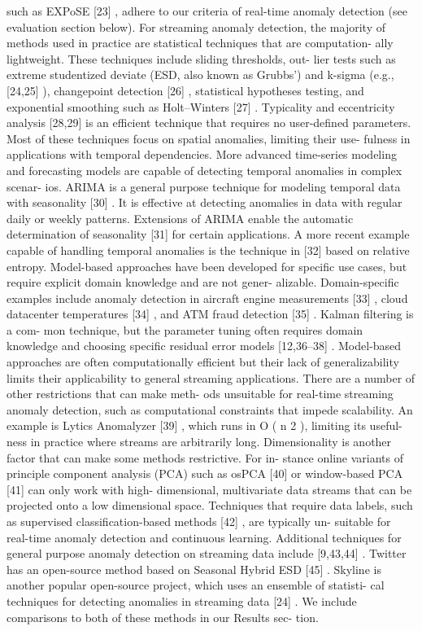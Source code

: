 \documentclass[12pt]{article}
\begin{document}
such as EXPoSE [23] , adhere to our criteria of real-time anomaly
detection (see evaluation section below).
For streaming anomaly detection, the majority of methods
used in practice are statistical techniques that are computation-
ally lightweight. These techniques include sliding thresholds, out-
lier tests such as extreme studentized deviate (ESD, also known
as Grubbs’) and k-sigma (e.g., [24,25] ), changepoint detection [26] ,
statistical hypotheses testing, and exponential smoothing such as
Holt–Winters [27] . Typicality and eccentricity analysis [28,29] is an
efficient technique that requires no user-defined parameters. Most
of these techniques focus on spatial anomalies, limiting their use-
fulness in applications with temporal dependencies.
More advanced time-series modeling and forecasting models
are capable of detecting temporal anomalies in complex scenar-
ios. ARIMA is a general purpose technique for modeling temporal
data with seasonality [30] . It is effective at detecting anomalies in
data with regular daily or weekly patterns. Extensions of ARIMA
enable the automatic determination of seasonality [31] for certain
applications. A more recent example capable of handling temporal
anomalies is the technique in [32] based on relative entropy.
Model-based approaches have been developed for specific use
cases, but require explicit domain knowledge and are not gener-
alizable. Domain-specific examples include anomaly detection in
aircraft engine measurements [33] , cloud datacenter temperatures
[34] , and ATM fraud detection [35] . Kalman filtering is a com-
mon technique, but the parameter tuning often requires domain
knowledge and choosing specific residual error models [12,36–38] .
Model-based approaches are often computationally efficient but
their lack of generalizability limits their applicability to general
streaming applications. There are a number of other restrictions that can make meth-
ods unsuitable for real-time streaming anomaly detection, such as
computational constraints that impede scalability. An example is
Lytics Anomalyzer [39] , which runs in O ( n 2 ), limiting its useful-
ness in practice where streams are arbitrarily long. Dimensionality
is another factor that can make some methods restrictive. For in-
stance online variants of principle component analysis (PCA) such
as osPCA [40] or window-based PCA [41] can only work with high-
dimensional, multivariate data streams that can be projected onto
a low dimensional space. Techniques that require data labels, such
as supervised classification-based methods [42] , are typically un-
suitable for real-time anomaly detection and continuous learning.
Additional techniques for general purpose anomaly detection
on streaming data include [9,43,44] . Twitter has an open-source
method based on Seasonal Hybrid ESD [45] . Skyline is another
popular open-source project, which uses an ensemble of statisti-
cal techniques for detecting anomalies in streaming data [24] . We
include comparisons to both of these methods in our Results sec-
tion.
\end{document}
